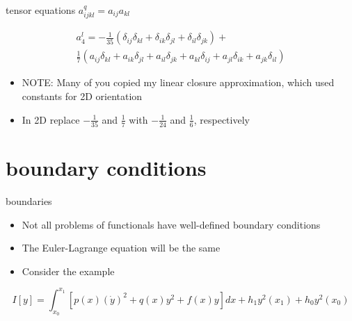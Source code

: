 \documentclass[
  letterpaper,
  ignorenonframetext,
  aspectratio=43,
  handout,
  12pt]{beamer}
\providecommand{\tightlist}{%
  \setlength{\itemsep}{0pt}\setlength{\parskip}{0pt}}
\providecommand{\tightlist}{%
\setlength{\itemsep}{0pt}\setlength{\parskip}{0pt}}
\begin{document}
\begin{frame}{tensor equations}
\protect\hypertarget{tensor-equations}{}
\(a_{ijkl}^q = a_{ij}a_{kl}\)

\[\begin{gathered}
  a_4^l = -\frac{1}{35}(\delta_{ij} \delta_{kl} + \delta_{ik} \delta_{jl} + \delta_{il}\delta_{jk}) + \\
  \frac{1}{7} (a_{ij} \delta_{kl} + a_{ik}\delta_{jl} + a_{il}\delta_{jk} + a_{kl} \delta_{ij} + a_{jl}\delta_{ik} + a_{jk}\delta_{il})
\end{gathered}\]

\begin{itemize}
\tightlist
\item
  NOTE: Many of you copied my linear closure approximation, which used
  constants for 2D orientation
\item
  In 2D replace \(-\frac{1}{35}\) and \(\frac{1}{7}\) with
  \(-\frac{1}{24}\) and \(\frac{1}{6}\), respectively
\end{itemize}
\end{frame}

\hypertarget{boundary-conditions}{%
\section{boundary conditions}\label{boundary-conditions}}

\begin{frame}{boundaries}
\protect\hypertarget{boundaries}{}
\begin{itemize}
\tightlist
\item
  Not all problems of functionals have well-defined boundary conditions
\item
  The Euler-Lagrange equation will be the same
\item
  Consider the example
\end{itemize}

\[I[y] = \int_{x_0}^{x_1} [p(x)(\dot{y})^2 + q(x) y^2 + f(x)y]dx + h_1y^2(x_1) + h_0y^2(x_0)\]
\end{frame}
\end{document}
